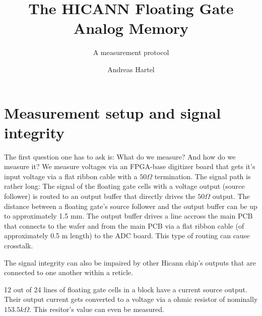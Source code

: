 \documentclass[a4paper,twocolumn,draft=true]{scrartcl}
\title{The HICANN Floating Gate Analog Memory}
\subtitle{A measurement protocol}
\author{Andreas Hartel}
\begin{document}
\maketitle
\section{Measurement setup and signal integrity}
The first question one has to ask is: What do we measure? And how do we measure it?
We measure voltages via an FPGA-base digitizer board that gets it's input voltage via a flat ribbon cable
with a $50\Omega$ termination.
The signal path is rather long:
The signal of the floating gate cells with a voltage output (source follower) is routed to an output buffer that directly drives the $50\Omega$ output. The distance between a floating gate's source follower and the output buffer can be up to approximately 1.5 mm.
The output buffer drives a line accross the main PCB that connects to the wafer and from the main PCB via a flat ribbon cable (of approximately 0.5 m length) to the ADC board.
This type of routing can cause crosstalk.

The signal integrity can also be impaired by other Hicann chip's outputs that are connected to one another within a reticle.

12 out of 24 lines of floating gate cells in a block have a current source output.
Their output current gets converted to a voltage via a ohmic resistor of nominally $153.5 k\Omega$.
This resitor's value can even be measured.

% 
%
%
\end{document}
